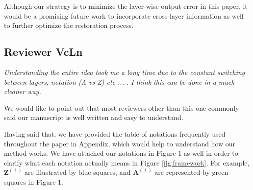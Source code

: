 Although our strategy is to minimize the layer-wise output error in this paper, it would be a promising future work to incorporate cross-layer information as well to further optimize the restoration process.











\subsection*{Reviewer VcLn }

\textit{Understanding the entire idea took me a long time due to the constant switching between layers, notation (A vs Z) etc ... . I think this can be done in a much cleaner way.}

We would like to point out that most reviewers other than this one commonly said our manuscript is well written and easy to understand.

Having said that, we have provided the table of notations frequently used throughout the paper in Appendix, which would help to understand how our method works. We have attached our notations in Figure 1 as well in order to clarify what each notation actually means in Figure \ref{fig:framework}. For example, $\mathbf{Z}^{(\ell)}$ are illustrated by blue squares, and $\mathbf{A}^{(\ell)}$ are represented by green squares in Figure 1.



